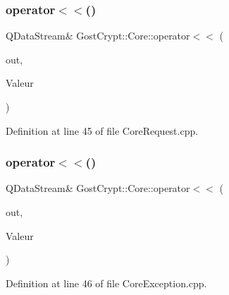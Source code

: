 \mbox{\label{namespace_gost_crypt_1_1_core_a5850fa0f8bc50e54af40c73552ab15f1}} 
\subsubsection{\texorpdfstring{operator$<$$<$()}{operator<<()}\hspace{0.1cm}{\footnotesize\ttfamily [5/56]}}
{\footnotesize\ttfamily Q\+Data\+Stream\& Gost\+Crypt\+::\+Core\+::operator$<$$<$ (\begin{DoxyParamCaption}\item[{Q\+Data\+Stream \&}]{out,  }\item[{const \hyperlink{struct_gost_crypt_1_1_core_1_1_create_volume_request}{Create\+Volume\+Request} \&}]{Valeur }\end{DoxyParamCaption})}



Definition at line 45 of file Core\+Request.\+cpp.

\mbox{\label{namespace_gost_crypt_1_1_core_a9c48f375029f746e7a901d76905c8e6a}} 
\subsubsection{\texorpdfstring{operator$<$$<$()}{operator<<()}\hspace{0.1cm}{\footnotesize\ttfamily [6/56]}}
{\footnotesize\ttfamily Q\+Data\+Stream\& Gost\+Crypt\+::\+Core\+::operator$<$$<$ (\begin{DoxyParamCaption}\item[{Q\+Data\+Stream \&}]{out,  }\item[{const \hyperlink{class_gost_crypt_1_1_core_1_1_device_not_mounted}{Gost\+Crypt\+::\+Core\+::\+Device\+Not\+Mounted} \&}]{Valeur }\end{DoxyParamCaption})}



Definition at line 46 of file Core\+Exception.\+cpp.

\mbox{\label{namespace_gost_crypt_1_1_core_a561fc2fc1534f1254f00853cb817f353}} 
